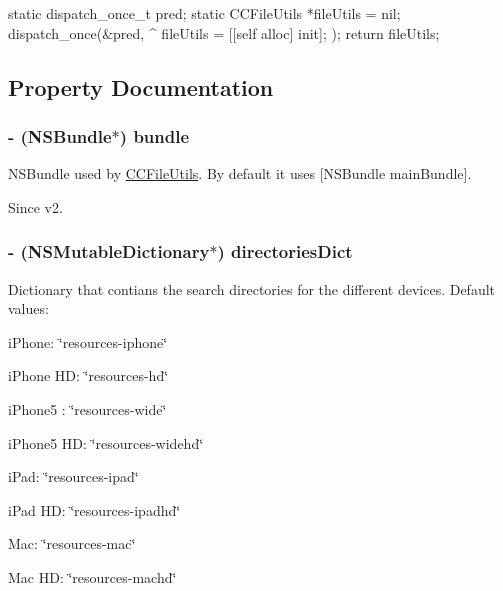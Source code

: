 \begin{DoxyCode}
{
        static dispatch_once_t pred;
        static CCFileUtils *fileUtils = nil;
        dispatch_once(&pred, ^{
                fileUtils = [[self alloc] init];
        });
        return fileUtils;
}
\end{DoxyCode}


\subsection{Property Documentation}
\hypertarget{class_c_c_file_utils_ac8f770647594f09b3df11985205c5188}{
\subsubsection[{bundle}]{\setlength{\rightskip}{0pt plus 5cm}-\/ (N\-S\-Bundle$\ast$) {\bf bundle}}}\label{class_c_c_file_utils_ac8f770647594f09b3df11985205c5188}
N\-S\-Bundle used by \hyperlink{class_c_c_file_utils}{C\-C\-File\-Utils}. By default it uses \mbox{[}N\-S\-Bundle main\-Bundle\mbox{]}. \begin{DoxySince}{Since}
v2. 
\end{DoxySince}
\hypertarget{class_c_c_file_utils_a3b6ba8817567c33a69a87e424b431f1f}{
\subsubsection[{directories\-Dict}]{\setlength{\rightskip}{0pt plus 5cm}-\/ (N\-S\-Mutable\-Dictionary$\ast$) {\bf directories\-Dict}}}\label{class_c_c_file_utils_a3b6ba8817567c33a69a87e424b431f1f}
Dictionary that contians the search directories for the different devices. Default values\-:
\begin{DoxyItemize}
\item i\-Phone\-: \char`\"{}resources-\/iphone\char`\"{}
\item i\-Phone H\-D\-: \char`\"{}resources-\/hd\char`\"{}
\item i\-Phone5 \-: \char`\"{}resources-\/wide\char`\"{}
\item i\-Phone5 H\-D\-: \char`\"{}resources-\/widehd\char`\"{}
\item i\-Pad\-: \char`\"{}resources-\/ipad\char`\"{}
\item i\-Pad H\-D\-: \char`\"{}resources-\/ipadhd\char`\"{}
\item Mac\-: \char`\"{}resources-\/mac\char`\"{}
\item Mac H\-D\-: \char`\"{}resources-\/machd\char`\"{}
\end{DoxyItemize}

